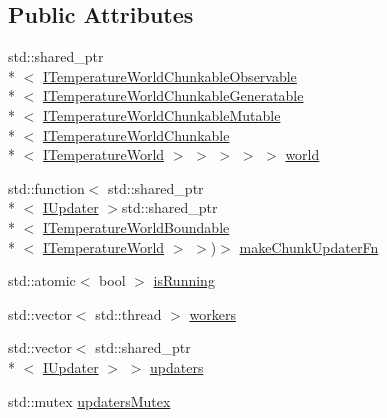 \subsection*{Public Attributes}
\begin{DoxyCompactItemize}
\item 
std\-::shared\-\_\-ptr\\*
$<$ \hyperlink{class_i_temperature_world_chunkable_observable}{I\-Temperature\-World\-Chunkable\-Observable}\\*
$<$ \hyperlink{class_i_temperature_world_chunkable_generatable}{I\-Temperature\-World\-Chunkable\-Generatable}\\*
$<$ \hyperlink{class_i_temperature_world_chunkable_mutable}{I\-Temperature\-World\-Chunkable\-Mutable}\\*
$<$ \hyperlink{class_i_temperature_world_chunkable}{I\-Temperature\-World\-Chunkable}\\*
$<$ \hyperlink{class_i_temperature_world}{I\-Temperature\-World} $>$ $>$ $>$ $>$ $>$ \hyperlink{struct_threaded_chunked_temperature_world_updater_1_1_thread_data_acc751ecf3ebda6bb89a20917380453de}{world}
\item 
std\-::function$<$ std\-::shared\-\_\-ptr\\*
$<$ \hyperlink{class_i_updater}{I\-Updater} $>$std\-::shared\-\_\-ptr\\*
$<$ \hyperlink{class_i_temperature_world_boundable}{I\-Temperature\-World\-Boundable}\\*
$<$ \hyperlink{class_i_temperature_world}{I\-Temperature\-World} $>$ $>$)$>$ \hyperlink{struct_threaded_chunked_temperature_world_updater_1_1_thread_data_aebe35eda756d6db5245a142e483f7a98}{make\-Chunk\-Updater\-Fn}
\item 
std\-::atomic$<$ bool $>$ \hyperlink{struct_threaded_chunked_temperature_world_updater_1_1_thread_data_a1c567a74e2d30e04a7b904697f5bc32d}{is\-Running}
\item 
std\-::vector$<$ std\-::thread $>$ \hyperlink{struct_threaded_chunked_temperature_world_updater_1_1_thread_data_a9007df155da319c2c0d22950a32151e1}{workers}
\item 
std\-::vector$<$ std\-::shared\-\_\-ptr\\*
$<$ \hyperlink{class_i_updater}{I\-Updater} $>$ $>$ \hyperlink{struct_threaded_chunked_temperature_world_updater_1_1_thread_data_aae121b9b1c5141ed421421fc6942ba4b}{updaters}
\item 
std\-::mutex \hyperlink{struct_threaded_chunked_temperature_world_updater_1_1_thread_data_a6c0d8bab86b56f10e84392aafc895488}{updaters\-Mutex}

\end{DoxyCompactItemize}
